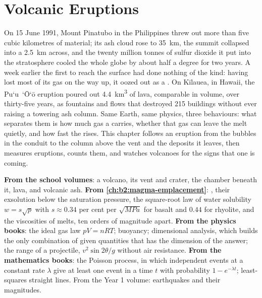 \chapter{Volcanic Eruptions}\label{ch:b2:eruptive-styles}

On 15 June 1991, Mount Pinatubo in the Philippines threw out more than five
cubic kilometres of material; its ash cloud rose to
\qty{35}{km}, the summit collapsed into a  \qty{2.5}{km} across, and the
twenty million tonnes of sulfur dioxide it put into the stratosphere cooled the
whole globe by about half a degree for two years. A week earlier the first
 to reach the surface had done nothing of the kind: having lost most of its
gas on the way up, it oozed out as a . On Kīlauea, in Hawaii, the
Pu`u~`\=O`\=o eruption poured out \qty{4.4}{km^3} of lava, comparable in volume,
over thirty-five years, as fountains and flows that destroyed 215 buildings
without ever raising a towering ash column. Same Earth, same physics, three behaviours: what
separates them is how much gas a  carries, whether that gas can leave the
melt quietly, and how fast the  rises. This chapter follows an eruption
from the bubbles in the conduit to the column above the vent and the deposits it
leaves, then measures eruptions, counts them, and watches volcanoes for the
signs that one is coming.

\begin{recall}
\textbf{From the school volumes}: a volcano, its vent and crater, the 
chamber beneath it, lava, and volcanic ash. \textbf{From
\cref{ch:b2:magma-emplacement}}: , their exsolution below the
saturation pressure, the square-root law of water solubility $w = s\sqrt p$ with
$s \approx 0.34$ per cent per $\sqrt{\unit{MPa}}$ for basalt and $0.44$ for
rhyolite, and the viscosities of melts, ten orders of magnitude apart.
\textbf{From the physics books}: the ideal gas law $pV = nRT$; buoyancy;
dimensional analysis, which builds the only combination of given quantities
that has the dimension of the answer; the range of a projectile, $v^2\sin 2\theta/g$
without air resistance. \textbf{From the mathematics books}: the Poisson process,
in which independent events at a constant rate $\lambda$ give at least one event
in a time $t$ with probability $1 - e^{-\lambda t}$; least-squares straight lines.
From the Year 1 volume: earthquakes and their magnitudes.
\end{recall}

